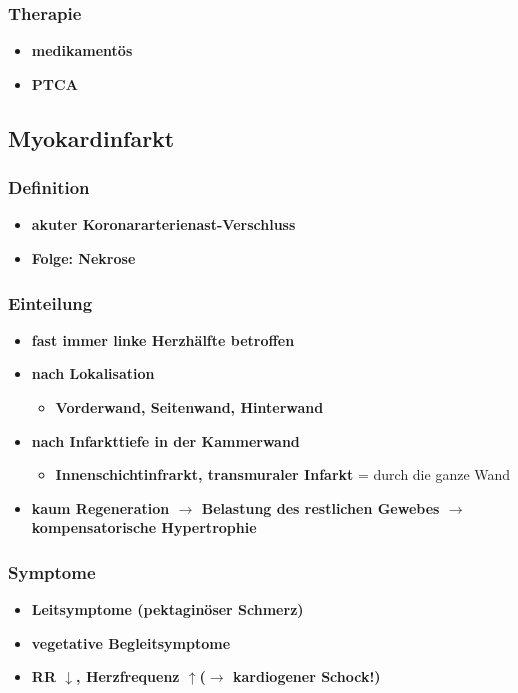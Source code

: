 		\subsubsection{Therapie}
			\begin{itemize}
				\item \textbf{medikamentös}
				\item \textbf{PTCA}
			\end{itemize}
	\subsection{Myokardinfarkt}
		\subsubsection{Definition}
			\begin{itemize}
				\item \textbf{akuter Koronararterienast-Verschluss}
				\item \textbf{Folge: Nekrose}
			\end{itemize}
		\subsubsection{Einteilung}
			\begin{itemize}
				\item \textbf{fast immer linke Herzhälfte betroffen}
				\item \textbf{nach Lokalisation}
					\begin{itemize}
						\item \textbf{Vorderwand, Seitenwand, Hinterwand}
					\end{itemize}
				\item \textbf{nach Infarkttiefe in der Kammerwand}
					\begin{itemize}
						\item \textbf{Innenschichtinfrarkt, transmuraler Infarkt} = durch die ganze Wand
					\end{itemize}
				\item \textbf{kaum Regeneration $\rightarrow$ Belastung des restlichen Gewebes $\rightarrow$ kompensatorische Hypertrophie}
			\end{itemize}
		\subsubsection{Symptome}
			\begin{itemize}
				\item \textbf{Leitsymptome (pektaginöser Schmerz)}
				\item \textbf{vegetative Begleitsymptome}
				\item \textbf{RR $\downarrow$, Herzfrequenz $\uparrow$($\rightarrow$ kardiogener Schock!)}
			\end{itemize}
